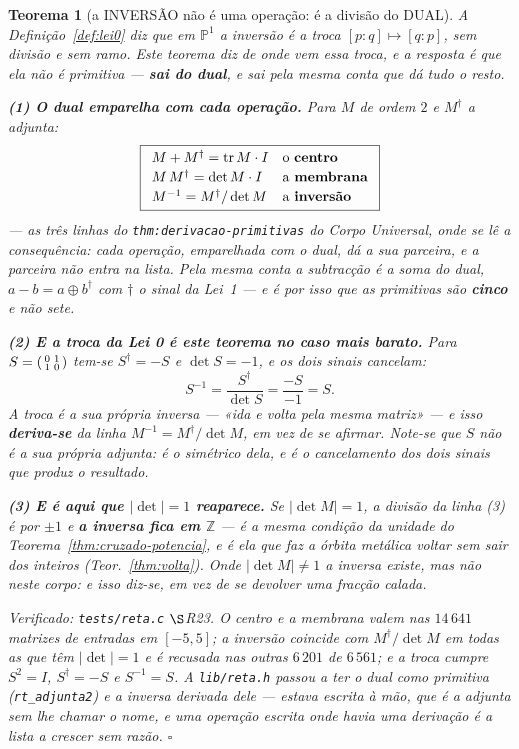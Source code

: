 \documentclass[11pt,a4paper]{article}
\newtheorem{teorema}{Teorema}
\newcommand{\code}[1]{\texttt{\small #1}}
\begin{document}
\begin{teorema}[a INVERSÃO não é uma operação: é a divisão do
DUAL]\label{thm:inversao-dual}
A Definição~\ref{def:lei0} diz que em $\mathbb{P}^1$ a inversão é a
\emph{troca} $[p:q]\mapsto[q:p]$, sem divisão e sem ramo. Este teorema diz de
onde vem essa troca, e a resposta é que ela não é primitiva --- \textbf{sai do
dual}, e sai pela mesma conta que dá tudo o resto.

\textbf{(1) O dual emparelha com cada operação.} Para $M$ de ordem $2$ e
$M^{\dagger}$ a adjunta:
\[
\boxed{
\begin{array}{lll}
M+M^{\dagger}=\operatorname{tr}M\cdot I & \text{o \textbf{centro}}\\[2pt]
M\,M^{\dagger}=\det M\cdot I & \text{a \textbf{membrana}}\\[2pt]
M^{-1}=M^{\dagger}/\det M & \text{a \textbf{inversão}}
\end{array}}
\]
--- as três linhas do \code{thm:derivacao-primitivas} do \emph{Corpo Universal},
onde se lê a consequência: \emph{cada operação, emparelhada com o dual, dá a sua
parceira, e a parceira não entra na lista}. Pela mesma conta a subtracção é a
soma do dual, $a-b=a\oplus b^{\dagger}$ com $\dagger$ o \emph{sinal} da Lei~1 --- e
é por isso que as primitivas são \textbf{cinco} e não sete.

\textbf{(2) E a troca da Lei 0 é este teorema no caso mais barato.} Para
$S=\begin{psmallmatrix}0&1\\1&0\end{psmallmatrix}$ tem-se $S^{\dagger}=-S$ e
$\det S=-1$, e os \emph{dois sinais cancelam}:
\[
S^{-1}=\frac{S^{\dagger}}{\det S}=\frac{-S}{-1}=S .
\]
A troca é a sua própria inversa --- «ida e volta pela mesma matriz» --- e isso
\textbf{deriva-se} da linha $M^{-1}=M^{\dagger}/\det M$, em vez de se afirmar.
Note-se que $S$ \emph{não} é a sua própria adjunta: é o simétrico dela, e é o
cancelamento dos dois sinais que produz o resultado.

\textbf{(3) E é aqui que $|\det|=1$ reaparece.} Se $|\det M|=1$, a divisão da
linha (3) é por $\pm1$ e \textbf{a inversa fica em $\mathbb{Z}$} --- é a mesma
condição da unidade do Teorema~\ref{thm:cruzado-potencia}, e é ela que faz a
órbita metálica voltar sem sair dos inteiros (Teor.~\ref{thm:volta}). Onde
$|\det M|\neq1$ a inversa existe, mas não neste corpo: e isso diz-se, em vez de
se devolver uma fracção calada.

\emph{Verificado:} \code{tests/reta.c} $\S$R23. O centro e a membrana valem nas
$14\,641$ matrizes de entradas em $[-5,5]$; a inversão coincide com
$M^{\dagger}/\det M$ em todas as que têm $|\det|=1$ e é \emph{recusada} nas
outras $6\,201$ de $6\,561$; e a troca cumpre $S^2=I$, $S^{\dagger}=-S$ e
$S^{-1}=S$. A \code{lib/reta.h} passou a ter o dual como primitiva
(\code{rt\_adjunta2}) e a inversa \emph{derivada} dele --- estava escrita à mão,
que é a adjunta sem lhe chamar o nome, e uma operação escrita onde havia uma
derivação é a lista a crescer sem razão. $\square$
\end{teorema}
\end{document}
